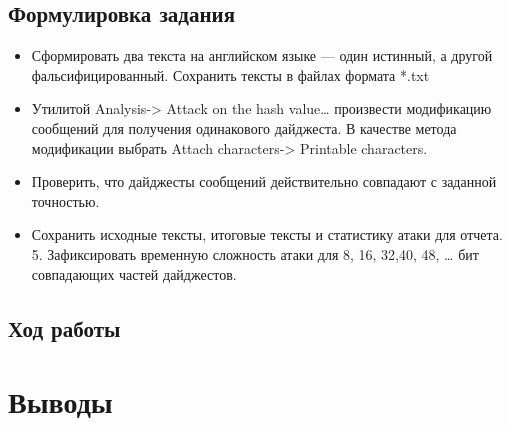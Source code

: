 \documentclass[a4paper, 14pt]{extarticle}
\begin{document}
\subsection{Формулировка задания}
\begin{itemize}
    \item  Сформировать два текста на английском языке --- один истинный, а другой фальсифицированный. Сохранить тексты в файлах формата *.txt
    \item  Утилитой Analysis-> Attack on the hash value\ldots{} произвести модификацию сообщений для получения одинакового дайджеста. В качестве метода модификации выбрать Attach characters-> Printable characters.
    \item  Проверить, что дайджесты сообщений действительно совпадают с заданной точностью.
    \item  Сохранить исходные тексты, итоговые тексты и статистику атаки для отчета.
5. Зафиксировать временную сложность атаки для 8, 16, 32,40, 48, … бит совпадающих частей дайджестов.
\end{itemize}

\subsection{Ход работы}
\lipsum[1] %

\section*{Выводы}
\lipsum[1] %
\end{document}
